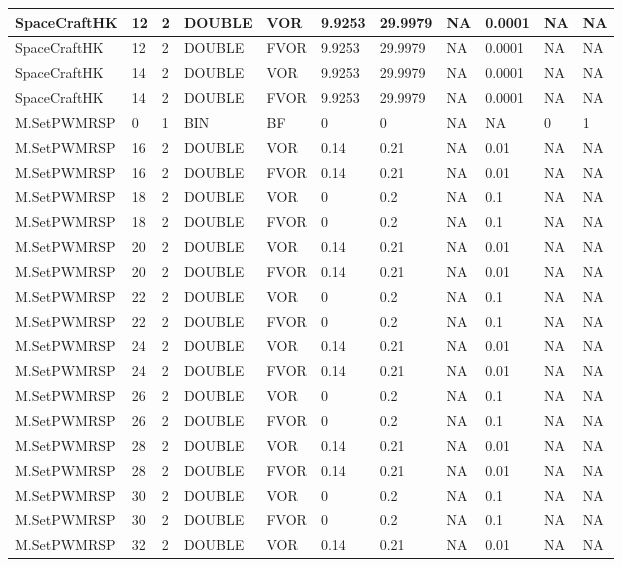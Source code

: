 {\begin{longtable}{|l|l|l|l|l|l|l|l|l|l|l|}
SpaceCraftHK & 12 & 2 & DOUBLE & VOR & 9.9253 & 29.9979 & NA & 0.0001 & NA & NA \\ \hline
SpaceCraftHK & 12 & 2 & DOUBLE & FVOR & 9.9253 & 29.9979 & NA & 0.0001 & NA & NA \\ \hline
SpaceCraftHK & 14 & 2 & DOUBLE & VOR & 9.9253 & 29.9979 & NA & 0.0001 & NA & NA \\ \hline
SpaceCraftHK & 14 & 2 & DOUBLE & FVOR & 9.9253 & 29.9979 & NA & 0.0001 & NA & NA \\ \hline
M.SetPWMRSP & 0 & 1 & BIN & BF & 0 & 0 & NA & NA & 0 & 1 \\ \hline
M.SetPWMRSP & 16 & 2 & DOUBLE & VOR & 0.14 & 0.21 & NA & 0.01 & NA & NA \\ \hline
M.SetPWMRSP & 16 & 2 & DOUBLE & FVOR & 0.14 & 0.21 & NA & 0.01 & NA & NA \\ \hline
M.SetPWMRSP & 18 & 2 & DOUBLE & VOR & 0 & 0.2 & NA & 0.1 & NA & NA \\ \hline
M.SetPWMRSP & 18 & 2 & DOUBLE & FVOR & 0 & 0.2 & NA & 0.1 & NA & NA \\ \hline
M.SetPWMRSP & 20 & 2 & DOUBLE & VOR & 0.14 & 0.21 & NA & 0.01 & NA & NA \\ \hline
M.SetPWMRSP & 20 & 2 & DOUBLE & FVOR & 0.14 & 0.21 & NA & 0.01 & NA & NA \\ \hline
M.SetPWMRSP & 22 & 2 & DOUBLE & VOR & 0 & 0.2 & NA & 0.1 & NA & NA \\ \hline
M.SetPWMRSP & 22 & 2 & DOUBLE & FVOR & 0 & 0.2 & NA & 0.1 & NA & NA \\ \hline
M.SetPWMRSP & 24 & 2 & DOUBLE & VOR & 0.14 & 0.21 & NA & 0.01 & NA & NA \\ \hline
M.SetPWMRSP & 24 & 2 & DOUBLE & FVOR & 0.14 & 0.21 & NA & 0.01 & NA & NA \\ \hline
M.SetPWMRSP & 26 & 2 & DOUBLE & VOR & 0 & 0.2 & NA & 0.1 & NA & NA \\ \hline
M.SetPWMRSP & 26 & 2 & DOUBLE & FVOR & 0 & 0.2 & NA & 0.1 & NA & NA \\ \hline
M.SetPWMRSP & 28 & 2 & DOUBLE & VOR & 0.14 & 0.21 & NA & 0.01 & NA & NA \\ \hline
M.SetPWMRSP & 28 & 2 & DOUBLE & FVOR & 0.14 & 0.21 & NA & 0.01 & NA & NA \\ \hline
M.SetPWMRSP & 30 & 2 & DOUBLE & VOR & 0 & 0.2 & NA & 0.1 & NA & NA \\ \hline
M.SetPWMRSP & 30 & 2 & DOUBLE & FVOR & 0 & 0.2 & NA & 0.1 & NA & NA \\ \hline
M.SetPWMRSP & 32 & 2 & DOUBLE & VOR & 0.14 & 0.21 & NA & 0.01 & NA & NA \\ \hline

\end{longtable}}
